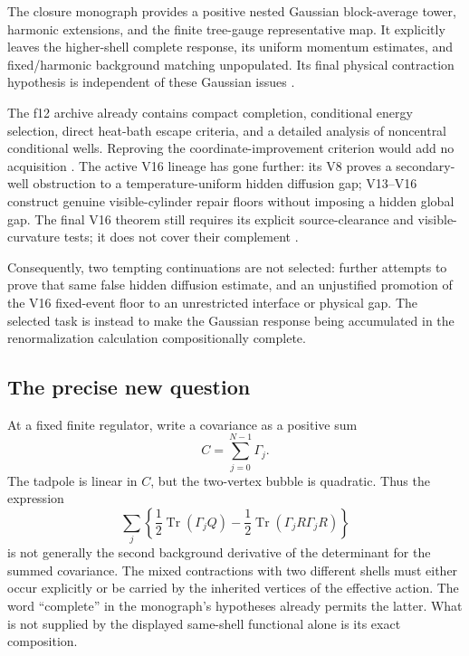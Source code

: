 \documentclass[11pt,a4paper]{article}
\theoremstyle{definition}
\theoremstyle{remark}
\DeclareMathOperator{\Tr}{Tr}
\newcommand{\src}[2]{\cite[#2]{#1}}
\begin{document}
The closure monograph provides a positive nested Gaussian block-average
tower, harmonic extensions, and the finite tree-gauge representative
map. It explicitly leaves the higher-shell complete response, its
uniform momentum estimates, and fixed/harmonic background matching
unpopulated. Its final physical contraction hypothesis is independent
of these Gaussian issues \src{YM3}{Chapters on the explicit Gaussian
tower, the physical spectral endpoint, and integrated conditional
closure}.

The f12 archive already contains compact completion, conditional energy
selection, direct heat-bath escape criteria, and a detailed analysis of
noncentral conditional wells. Reproving the coordinate-improvement
criterion would add no acquisition \src{F12}{V18, V74, V89--V100}.
The active V16 lineage has gone further: its V8 proves a secondary-well
obstruction to a temperature-uniform hidden diffusion gap; V13--V16
construct genuine visible-cylinder repair floors without imposing a
hidden global gap. The final V16 theorem still requires its explicit
source-clearance and visible-curvature tests; it does not cover their
complement \src{F13}{V8, V13--V16}.

Consequently, two tempting continuations are not selected: further
attempts to prove that same false hidden diffusion estimate, and an
unjustified promotion of the V16 fixed-event floor to an unrestricted
interface or physical gap. The selected task is instead to make the
Gaussian response being accumulated in the renormalization calculation
compositionally complete.

\subsection{The precise new question}
At a fixed finite regulator, write a covariance as a positive sum
\[
                    C=\sum_{j=0}^{N-1}\Gamma_j.
\]
The tadpole is linear in $C$, but the two-vertex bubble is quadratic.
Thus the expression
\[
 \sum_j\left\{\frac12\Tr(\Gamma_j Q)
                  -\frac12\Tr(\Gamma_jR\Gamma_jR)\right\}
\]
is not generally the second background derivative of the determinant
for the summed covariance. The mixed contractions with two different
shells must either occur explicitly or be carried by the inherited
vertices of the effective action. The word ``complete'' in the
monograph's hypotheses already permits the latter. What is not supplied
by the displayed same-shell functional alone is its exact composition.
\end{document}
